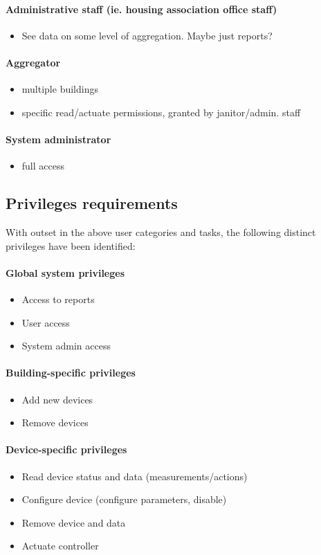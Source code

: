 \paragraph{Administrative staff (ie. housing association office staff)}
\begin{itemize}
    \item{See data on some level of aggregation. Maybe just reports?}
\end{itemize}

\paragraph{Aggregator}
\begin{itemize}
    \item{multiple buildings}
    \item{specific read/actuate permissions, granted by janitor/admin. staff}
\end{itemize}

\paragraph{System administrator}
\begin{itemize}
    \item{full access}
\end{itemize}

\newpage
\subsection{Privileges requirements} \label{subsection:PrivilegesRequirements}
With outset in the above user categories and tasks, the following distinct privileges have been identified:

\paragraph{Global system privileges}
\begin{itemize}
    \item{Access to reports}
    \item{User access}
    \item{System admin access}
\end{itemize}

\paragraph{Building-specific privileges}
\begin{itemize}
    \item{Add new devices}
    \item{Remove devices}
\end{itemize}

\paragraph{Device-specific privileges}
\begin{itemize}
    \item{Read device status and data (measurements/actions)}
    \item{Configure device (configure parameters, disable)}
    \item{Remove device and data}
    \item{Actuate controller}
\end{itemize}